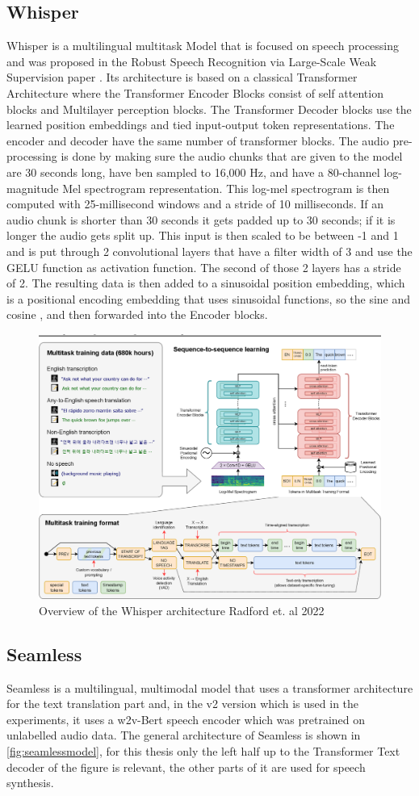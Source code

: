 \subsection{Whisper}
Whisper is a multilingual multitask Model that is focused on speech processing and was proposed in the Robust Speech Recognition via Large-Scale Weak Supervision paper \cite{radford2022robust}. 
Its architecture is based on a classical Transformer Architecture where the Transformer Encoder Blocks consist of self attention blocks and Multilayer perception blocks. 
The Transformer Decoder blocks use the learned position embeddings and tied input-output token representations. 
The encoder and decoder have the same number of transformer blocks.
The audio pre-processing is done by making sure the audio chunks that are given to the model are 30 seconds long, have ben sampled to 16,000 Hz, and have a 80-channel log-magnitude Mel spectrogram representation. This log-mel spectrogram is then computed with 25-millisecond windows and a stride of 10 milliseconds. If an audio chunk is shorter than 30 seconds it gets padded up to 30 seconds; if it is longer the audio gets split up. 
This input is then scaled to be between -1 and 1 and is put through 2 convolutional layers that have a filter width of 3 and use the GELU function as activation function. The second of those 2 layers has a stride of 2. 
The resulting data is then added to a sinusoidal position embedding, which is a positional encoding embedding that uses sinusoidal functions, so the sine and cosine \cite{vaswani2023attentionneed}, and then forwarded into the Encoder blocks.

\begin{figure}
        \centering%
        \includegraphics[width=0.5\linewidth]{Latex//sections//images/whispermodel.png}
        \caption{Overview of the Whisper architecture Radford et. al 2022}
        \label{fig:whispermodel}
    \end{figure}



\subsection{Seamless}
Seamless \cite{seamless2023} is a multilingual, multimodal model that uses a transformer architecture for the text translation part and, in the v2 version which is used in the experiments, it uses a w2v-Bert speech encoder which was pretrained on unlabelled audio data. 
The general architecture of Seamless is shown in \autoref{fig:seamlessmodel}, for this thesis only the left half up to the Transformer Text decoder of the figure is relevant, the other parts of it are used for speech synthesis.

